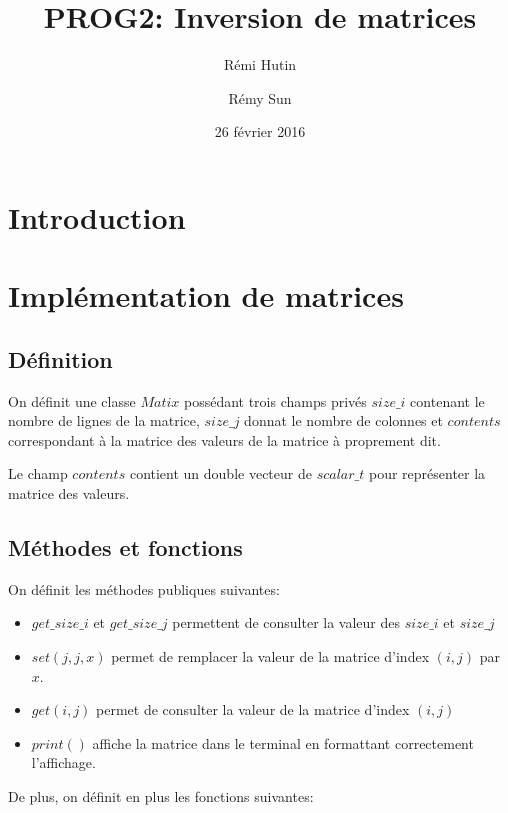 \documentclass[a4paper,11pt]{article}
\title{PROG2: Inversion de matrices}
\author{Rémi Hutin \and Rémy Sun}
\date{26 février 2016}
\begin{document}
\maketitle

\begin{abstract}

\end{abstract}

\section*{Introduction}


\section{Implémentation de matrices}

\subsection{Définition}

On définit une classe $Matix$ possédant trois champs privés $size\_i$ contenant le nombre de lignes de la matrice, $size\_j$ donnat le nombre de colonnes et
 $contents$ correspondant à la matrice des valeurs de la matrice à proprement dit.

Le champ $contents$ contient un double vecteur de $scalar\_t$ pour représenter la matrice des valeurs.

\subsection{Méthodes et fonctions}

On définit les méthodes publiques suivantes:

\begin{itemize}
\item $get\_size\_i$ et $get\_size\_j$ permettent de consulter la valeur des $size\_i$ et $size\_j$
\item $set(j,j,x)$ permet de remplacer la valeur de la matrice d'index $(i,j)$ par $x$.
\item $get(i,j)$ permet de consulter la valeur de la matrice d'index $(i,j)$
\item $print()$ affiche la matrice dans le terminal en formattant correctement l'affichage.
\end{itemize}

De plus, on définit en plus les fonctions suivantes:
\end{document}
